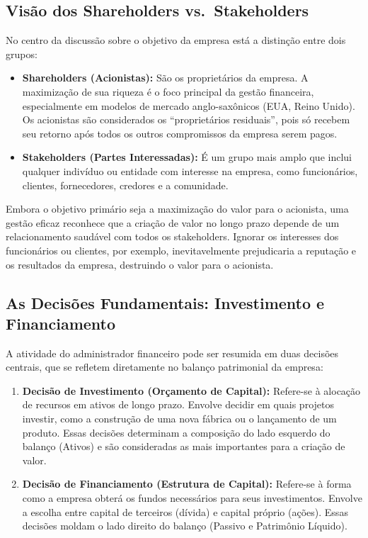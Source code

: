 \documentclass[
  a4paper,
]{book}
\providecommand{\tightlist}{%
  \setlength{\itemsep}{0pt}\setlength{\parskip}{0pt}}\usepackage{longtable,booktabs,array}
\begin{document}
\subsection{Visão dos Shareholders
vs.~Stakeholders}\label{visuxe3o-dos-shareholders-vs.-stakeholders}

No centro da discussão sobre o objetivo da empresa está a distinção
entre dois grupos:

\begin{itemize}
\tightlist
\item
  \textbf{Shareholders (Acionistas):} São os proprietários da empresa. A
  maximização de sua riqueza é o foco principal da gestão financeira,
  especialmente em modelos de mercado anglo-saxônicos (EUA, Reino
  Unido). Os acionistas são considerados os ``proprietários residuais'',
  pois só recebem seu retorno após todos os outros compromissos da
  empresa serem pagos.
\item
  \textbf{Stakeholders (Partes Interessadas):} É um grupo mais amplo que
  inclui qualquer indivíduo ou entidade com interesse na empresa, como
  funcionários, clientes, fornecedores, credores e a comunidade.
\end{itemize}

Embora o objetivo primário seja a maximização do valor para o acionista,
uma gestão eficaz reconhece que a criação de valor no longo prazo
depende de um relacionamento saudável com todos os stakeholders. Ignorar
os interesses dos funcionários ou clientes, por exemplo, inevitavelmente
prejudicaria a reputação e os resultados da empresa, destruindo o valor
para o acionista.

\subsection{As Decisões Fundamentais: Investimento e
Financiamento}\label{as-decisuxf5es-fundamentais-investimento-e-financiamento}

A atividade do administrador financeiro pode ser resumida em duas
decisões centrais, que se refletem diretamente no balanço patrimonial da
empresa:

\begin{enumerate}
\def\labelenumi{\arabic{enumi}.}
\tightlist
\item
  \textbf{Decisão de Investimento (Orçamento de Capital):} Refere-se à
  alocação de recursos em ativos de longo prazo. Envolve decidir em
  quais projetos investir, como a construção de uma nova fábrica ou o
  lançamento de um produto. Essas decisões determinam a composição do
  lado esquerdo do balanço (Ativos) e são consideradas as mais
  importantes para a criação de valor.
\item
  \textbf{Decisão de Financiamento (Estrutura de Capital):} Refere-se à
  forma como a empresa obterá os fundos necessários para seus
  investimentos. Envolve a escolha entre capital de terceiros (dívida) e
  capital próprio (ações). Essas decisões moldam o lado direito do
  balanço (Passivo e Patrimônio Líquido).
\end{enumerate}
\end{document}
